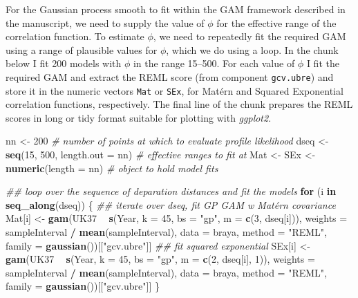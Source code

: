 \documentclass[12pt,]{article}
\newenvironment{Shaded}{\begin{snugshade}}{\end{snugshade}}
\newcommand{\CommentTok}[1]{\textcolor[rgb]{0.56,0.35,0.01}{\textit{#1}}}
\newcommand{\ControlFlowTok}[1]{\textcolor[rgb]{0.13,0.29,0.53}{\textbf{#1}}}
\newcommand{\DataTypeTok}[1]{\textcolor[rgb]{0.13,0.29,0.53}{#1}}
\newcommand{\DecValTok}[1]{\textcolor[rgb]{0.00,0.00,0.81}{#1}}
\newcommand{\KeywordTok}[1]{\textcolor[rgb]{0.13,0.29,0.53}{\textbf{#1}}}
\newcommand{\NormalTok}[1]{#1}
\newcommand{\OperatorTok}[1]{\textcolor[rgb]{0.81,0.36,0.00}{\textbf{#1}}}
\newcommand{\StringTok}[1]{\textcolor[rgb]{0.31,0.60,0.02}{#1}}
\begin{document}
For the Gaussian process smooth to fit within the GAM framework
described in the manuscript, we need to supply the value of \(\phi\) for
the effective range of the correlation function. To estimate \(\phi\),
we need to repeatedly fit the required GAM using a range of plausible
values for \(\phi\), which we do using a loop. In the chunk below I fit
200 models with \(\phi\) in the range 15--500. For each value of
\(\phi\) I fit the required GAM and extract the REML score (from
component \texttt{gcv.ubre}) and store it in the numeric vectors
\texttt{Mat} or \texttt{SEx}, for Matérn and Squared Exponential
correlation functions, respectively. The final line of the chunk
prepares the REML scores in long or tidy format suitable for plotting
with \emph{ggplot2}.

\begin{Shaded}
\begin{Highlighting}[]
\NormalTok{nn <-}\StringTok{ }\DecValTok{200}    \CommentTok{# number of points at which to evaluate profile likelihood}
\NormalTok{dseq <-}\StringTok{ }\KeywordTok{seq}\NormalTok{(}\DecValTok{15}\NormalTok{, }\DecValTok{500}\NormalTok{, }\DataTypeTok{length.out =}\NormalTok{ nn)  }\CommentTok{# effective ranges to fit at}
\NormalTok{Mat <-}\StringTok{ }\NormalTok{SEx <-}\StringTok{ }\KeywordTok{numeric}\NormalTok{(}\DataTypeTok{length =}\NormalTok{ nn)     }\CommentTok{# object to hold model fits}

\CommentTok{## loop over the sequence of deparation distances and fit the models}
\ControlFlowTok{for}\NormalTok{ (i }\ControlFlowTok{in} \KeywordTok{seq_along}\NormalTok{(dseq)) \{ }
    \CommentTok{## iterate over dseq, fit GP GAM w Matérn covariance}
\NormalTok{    Mat[i] <-}\StringTok{ }\KeywordTok{gam}\NormalTok{(UK37 }\OperatorTok{~}\StringTok{ }\KeywordTok{s}\NormalTok{(Year, }\DataTypeTok{k =} \DecValTok{45}\NormalTok{, }\DataTypeTok{bs =} \StringTok{"gp"}\NormalTok{, }\DataTypeTok{m =} \KeywordTok{c}\NormalTok{(}\DecValTok{3}\NormalTok{, dseq[i])),}
                  \DataTypeTok{weights =}\NormalTok{ sampleInterval }\OperatorTok{/}\StringTok{ }\KeywordTok{mean}\NormalTok{(sampleInterval),}
                  \DataTypeTok{data =}\NormalTok{ braya, }\DataTypeTok{method =} \StringTok{"REML"}\NormalTok{,}
                  \DataTypeTok{family =} \KeywordTok{gaussian}\NormalTok{())[[}\StringTok{"gcv.ubre"}\NormalTok{]]}
    \CommentTok{## fit squared exponential}
\NormalTok{    SEx[i] <-}\StringTok{ }\KeywordTok{gam}\NormalTok{(UK37 }\OperatorTok{~}\StringTok{ }\KeywordTok{s}\NormalTok{(Year, }\DataTypeTok{k =} \DecValTok{45}\NormalTok{, }\DataTypeTok{bs =} \StringTok{"gp"}\NormalTok{, }\DataTypeTok{m =} \KeywordTok{c}\NormalTok{(}\DecValTok{2}\NormalTok{, dseq[i], }\DecValTok{1}\NormalTok{)),}
                  \DataTypeTok{weights =}\NormalTok{ sampleInterval }\OperatorTok{/}\StringTok{ }\KeywordTok{mean}\NormalTok{(sampleInterval),}
                  \DataTypeTok{data =}\NormalTok{ braya, }\DataTypeTok{method =} \StringTok{"REML"}\NormalTok{,}
                  \DataTypeTok{family =} \KeywordTok{gaussian}\NormalTok{())[[}\StringTok{"gcv.ubre"}\NormalTok{]]}
\NormalTok{\}}


\end{Highlighting}
\end{Shaded}
\end{document}
